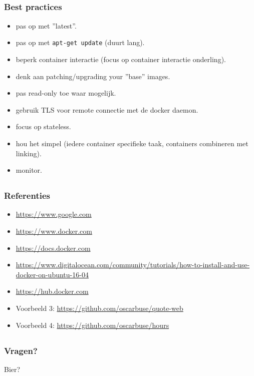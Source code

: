 \subsection{}
\begin{styleframefrag}
    \frametitle{Best practices}
\begin{itemize}
	\item pas op met ''latest''.
	\pause
	\item pas op met \verb!apt-get update! (duurt lang).
	\pause
	\item beperk container interactie (focus op container interactie onderling).
	\pause
	\item denk aan patching/upgrading your ''base'' images.
	\pause
	\item pas read-only toe waar mogelijk.
	\pause
	\item gebruik TLS voor remote connectie met de docker daemon.
	\pause
	\item focus op stateless.
	\pause
	\item hou het simpel (iedere container specifieke taak, containers combineren met linking).
	\pause
	\item monitor.
\end{itemize}
\end{styleframefrag}

\subsection{}
\begin{styleframe}
    \frametitle{Referenties}
\begin{itemize}
	\item \url{https://www.google.com}
	\item \url{https://www.docker.com}
	\item \url{https://docs.docker.com}
	\item \url{https://www.digitalocean.com/community/tutorials/how-to-install-and-use-docker-on-ubuntu-16-04}
	\item \url{https://hub.docker.com}
	\item Voorbeeld 3: \url{https://github.com/oscarbuse/quote-web}
	\item Voorbeeld 4: \url{https://github.com/oscarbuse/hours}
\end{itemize}
\end{styleframe}

\subsection{}
\begin{styleframe}
    \frametitle{Vragen?}
\begin{center}
\hspace{-20pt} \Huge Bier?
\end{center}
\end{styleframe}
